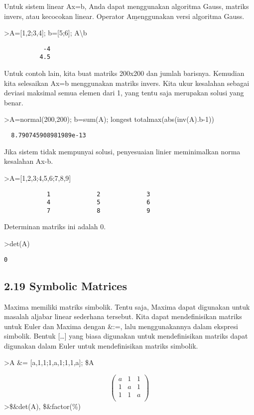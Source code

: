 \documentclass[
]{book}
\begin{document}
Untuk sistem linear Ax=b, Anda dapat menggunakan algoritma Gauss, matriks invers, atau kecocokan linear. Operator A\b menggunakan versi algoritma Gauss.

\textgreater A={[}1,2;3,4{]}; b={[}5;6{]}; A\textbackslash b

\begin{verbatim}
           -4 
          4.5 
\end{verbatim}

Untuk contoh lain, kita buat matriks 200x200 dan jumlah barisnya. Kemudian kita selesaikan Ax=b menggunakan matriks invers. Kita ukur kesalahan sebagai deviasi maksimal semua elemen dari 1, yang tentu saja merupakan solusi yang benar.

\textgreater A=normal(200,200); b=sum(A); longest totalmax(abs(inv(A).b-1))

\begin{verbatim}
  8.790745908981989e-13 
\end{verbatim}

Jika sistem tidak mempunyai solusi, penyesuaian linier meminimalkan norma kesalahan Ax-b.

\textgreater A={[}1,2,3;4,5,6;7,8,9{]}

\begin{verbatim}
            1             2             3 
            4             5             6 
            7             8             9 
\end{verbatim}

Determinan matriks ini adalah 0.

\textgreater det(A)

\begin{verbatim}
0
\end{verbatim}

\subsection{2.19 Symbolic Matrices}\label{symbolic-matrices}

Maxima memiliki matriks simbolik. Tentu saja, Maxima dapat digunakan untuk masalah aljabar linear sederhana tersebut. Kita dapat mendefinisikan matriks untuk Euler dan Maxima dengan \&:=, lalu menggunakannya dalam ekspresi simbolik. Bentuk {[}\ldots{]} yang biasa digunakan untuk mendefinisikan matriks dapat digunakan dalam Euler untuk mendefinisikan matriks simbolik.

\textgreater A \&= {[}a,1,1;1,a,1;1,1,a{]}; \$A

\[\begin{pmatrix}a & 1 & 1 \\ 1 & a & 1 \\ 1 & 1 & a \\ \end{pmatrix}\]\textgreater\$\&det(A), \$\&factor(\%)
\end{document}
